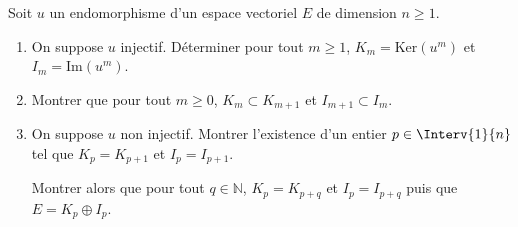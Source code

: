 \documentclass[a4paper,10pt]{report}
\begin{document}
\begin{Exa}
Soit $u$ un endomorphisme d'un espace vectoriel $E$ de dimension $n \geq 1$.
\begin{enumerate}
\item On suppose $u$ injectif. Déterminer pour tout $m \geq 1$, $K_m = \textrm{Ker}(u^m)$ et $I_m = \textrm{Im}(u^m)$.
\item Montrer que pour tout $m \geq 0$, $K_m \subset K_{m+1}$ et $I_{m+1} \subset I_m$.
\item On suppose $u$ non injectif. Montrer l'existence d'un entier $p \in \Interv{1}{n}$ tel que $K_p=K_{p+1}$ et $I_p = I_{p+1}$.

\noindent Montrer alors que pour tout $q \in \mathbb{N}$, $K_p = K_{p+q}$ et $I_p = I_{p+q}$ puis que $E = K_p \oplus I_p$.
\end{enumerate}
\end{Exa} 
\end{document}
